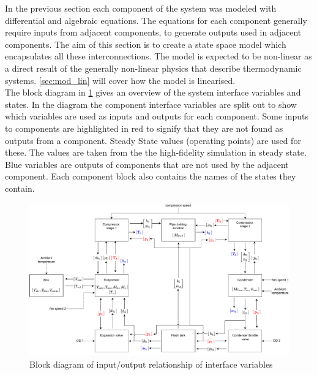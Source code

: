 
In the previous section each component of the system was modeled with differential and algebraic equations. The equations for each component generally require inputs from adjacent components, to generate outputs used in adjacent components. The aim of this section is to create a state space model which encapsulates all these interconnections. The model is expected to be non-linear as a direct result of the generally non-linear physics that describe thermodynamic systems. \cref{sec:mod_lin} will cover how the model is linearised.\\

The block diagram in \cref{fig:Block_diagram_inout} gives an overview of the system interface variables and states. In the diagram the component interface variables are split out to show which variables are used as inputs and outputs for each component. Some inputs to components are highlighted in red to signify that they are not found as outputs from a component. Steady State values (operating points) are used for these. The values are taken from the the high-fidelity simulation in steady state. Blue variables are outputs of components that are not used by the adjacent component. Each component block also contains the names of the states they contain.

\begin{figure}[h!]
	\centering
	\includegraphics[width=1\textwidth]{Graphics/Block_Diagram_inout_flowValveVersion.pdf}
	\caption{Block diagram of input/output relationship of interface variables}
	\label{fig:Block_diagram_inout}
\end{figure} 

